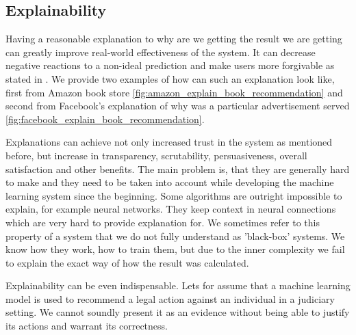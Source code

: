 \subsection{Explainability}
Having a reasonable explanation to why are we getting the result we are getting can greatly improve real-world effectiveness of the system. It can decrease negative reactions to a non-ideal prediction and make users more forgivable as stated in \cite{tintarev2007survey}. We provide two examples of how can such an explanation look like, first from Amazon book store \ref{fig:amazon_explain_book_recommendation} and second from Facebook's explanation of why was a particular advertisement served \ref{fig:facebook_explain_book_recommendation}.

Explanations can achieve not only increased trust in the system as mentioned before, but increase in transparency, scrutability, persuasiveness, overall satisfaction and other benefits. The main problem is, that they are generally hard to make and they need to be taken into account while developing the machine learning system since the beginning. Some algorithms are outright impossible to explain, for example neural networks. They keep context in neural connections which are very hard to provide explanation for. We sometimes refer to this property of a system that we do not fully understand as 'black-box' systems. We know how they work, how to train them, but due to the inner complexity we fail to explain the exact way of how the result was calculated.

Explainability can be even indispensable. Lets for assume that a machine learning model is used to recommend a legal action against an individual in a judiciary setting. We cannot soundly present it as an evidence without being able to justify its actions and warrant its correctness.


